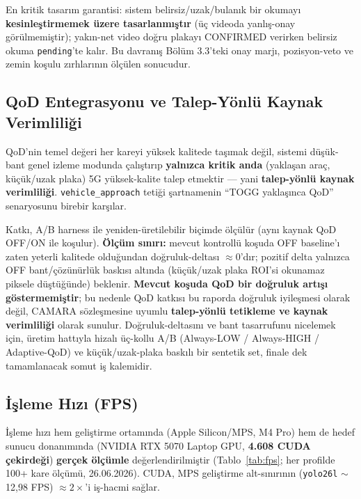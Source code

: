 \documentclass[12pt,a4paper]{article}
\newcommand{\tcode}[1]{\texttt{\small #1}}
\begin{document}
En kritik tasarım garantisi: sistem belirsiz/uzak/bulanık bir okumayı \textbf{kesinleştirmemek üzere
tasarlanmıştır} (üç videoda yanlış-onay görülmemiştir); yakın-net video doğru plakayı CONFIRMED
verirken belirsiz okuma \tcode{pending}'te kalır. Bu davranış Bölüm 3.3'teki onay marjı, pozisyon-veto ve zemin koşulu zırhlarının
ölçülen sonucudur.

\subsection{QoD Entegrasyonu ve Talep-Yönlü Kaynak Verimliliği}
QoD'nin temel değeri her kareyi yüksek kalitede taşımak değil, sistemi düşük-bant genel izleme modunda
çalıştırıp \textbf{yalnızca kritik anda} (yaklaşan araç, küçük/uzak plaka) 5G yüksek-kalite talep
etmektir — yani \textbf{talep-yönlü kaynak verimliliği}. \tcode{vehicle\_approach} tetiği şartnamenin
``TOGG yaklaşınca QoD'' senaryosunu birebir karşılar.

Katkı, A/B harness ile yeniden-üretilebilir biçimde ölçülür (aynı kaynak QoD OFF/ON ile koşulur).
\textbf{Ölçüm sınırı:} mevcut kontrollü koşuda OFF baseline'ı zaten yeterli kalitede olduğundan
doğruluk-deltası $\approx$0'dır; pozitif delta yalnızca OFF bant/çözünürlük baskısı altında (küçük/uzak
plaka ROI'si okunamaz piksele düştüğünde) beklenir. \textbf{Mevcut koşuda QoD bir doğruluk artışı
göstermemiştir}; bu nedenle QoD katkısı bu raporda doğruluk iyileşmesi olarak değil, CAMARA sözleşmesine
uyumlu \textbf{talep-yönlü tetikleme ve kaynak verimliliği} olarak sunulur. Doğruluk-deltasını ve bant
tasarrufunu nicelemek için, üretim hattıyla hizalı üç-kollu A/B (Always-LOW / Always-HIGH / Adaptive-QoD)
ve küçük/uzak-plaka baskılı bir sentetik set, finale dek tamamlanacak somut iş kalemidir.

\subsection{İşleme Hızı (FPS)}
İşleme hızı hem geliştirme ortamında (Apple Silicon/MPS, M4 Pro) hem de hedef sunucu donanımında
(NVIDIA RTX 5070 Laptop GPU, \textbf{4.608 CUDA çekirdeği}) \textbf{gerçek ölçümle} değerlendirilmiştir
(Tablo~\ref{tab:fps}; her profilde 100+ kare ölçümü, 26.06.2026). CUDA,
MPS geliştirme alt-sınırının (\tcode{yolo26l} $\sim$12,98 FPS) \textbf{${\approx}2\times$}'i iş-hacmi sağlar.
\end{document}
